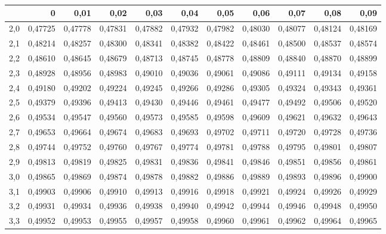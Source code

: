 \documentclass[14pt,aspectratio=1610]{beamer}
\begin{document}
\begin{frame}[fragile]{}
\frametitle{}
\begin{block}{}
\begin{center}
\small\addtolength{\tabcolsep}{-3pt}
{\footnotesize
\begin{tabular}{rrrrrrrrrrr}
  \hline
 & 0 & 0,01 & 0,02 & 0,03 & 0,04 & 0,05 & 0,06 & 0,07 & 0,08 & 0,09 \\ 
  \hline
2,0 & 0,47725 & 0,47778 & 0,47831 & 0,47882 & 0,47932 & 0,47982 & 0,48030 & 0,48077 & 0,48124 & 0,48169 \\ 
  2,1 & 0,48214 & 0,48257 & 0,48300 & 0,48341 & 0,48382 & 0,48422 & 0,48461 & 0,48500 & 0,48537 & 0,48574 \\ 
  2,2 & 0,48610 & 0,48645 & 0,48679 & 0,48713 & 0,48745 & 0,48778 & 0,48809 & 0,48840 & 0,48870 & 0,48899 \\ 
  2,3 & 0,48928 & 0,48956 & 0,48983 & 0,49010 & 0,49036 & 0,49061 & 0,49086 & 0,49111 & 0,49134 & 0,49158 \\ 
  2,4 & 0,49180 & 0,49202 & 0,49224 & 0,49245 & 0,49266 & 0,49286 & 0,49305 & 0,49324 & 0,49343 & 0,49361 \\ 
  2,5 & 0,49379 & 0,49396 & 0,49413 & 0,49430 & 0,49446 & 0,49461 & 0,49477 & 0,49492 & 0,49506 & 0,49520 \\ 
  2,6 & 0,49534 & 0,49547 & 0,49560 & 0,49573 & 0,49585 & 0,49598 & 0,49609 & 0,49621 & 0,49632 & 0,49643 \\ 
  2,7 & 0,49653 & 0,49664 & 0,49674 & 0,49683 & 0,49693 & 0,49702 & 0,49711 & 0,49720 & 0,49728 & 0,49736 \\ 
  2,8 & 0,49744 & 0,49752 & 0,49760 & 0,49767 & 0,49774 & 0,49781 & 0,49788 & 0,49795 & 0,49801 & 0,49807 \\ 
  2,9 & 0,49813 & 0,49819 & 0,49825 & 0,49831 & 0,49836 & 0,49841 & 0,49846 & 0,49851 & 0,49856 & 0,49861 \\ 
  3,0 & 0,49865 & 0,49869 & 0,49874 & 0,49878 & 0,49882 & 0,49886 & 0,49889 & 0,49893 & 0,49896 & 0,49900 \\ 
  3,1 & 0,49903 & 0,49906 & 0,49910 & 0,49913 & 0,49916 & 0,49918 & 0,49921 & 0,49924 & 0,49926 & 0,49929 \\ 
  3,2 & 0,49931 & 0,49934 & 0,49936 & 0,49938 & 0,49940 & 0,49942 & 0,49944 & 0,49946 & 0,49948 & 0,49950 \\ 
  3,3 & 0,49952 & 0,49953 & 0,49955 & 0,49957 & 0,49958 & 0,49960 & 0,49961 & 0,49962 & 0,49964 & 0,49965 \\ 

\end{tabular}}
\end{center}
\end{block}
\end{frame}
\end{document}
